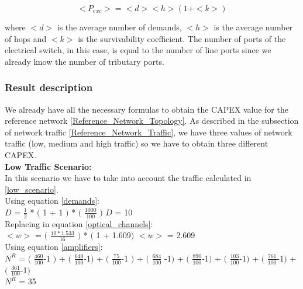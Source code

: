 \begin{equation}
<P_{exc}> = <d> <h> \left(1 + <k>\right)
\label{Pexc_opaque_protec}
\end{equation}

\vspace{11pt}
\noindent
where $<d>$ is the average number of demands, $<h>$ is the average number of hops and $<k>$	is the survivability coefficient. The number of ports of the electrical switch, in this case, is equal to the number of line ports since we already know the number of tributary ports.\\

\subsubsection{Result description}

We already have all the necessary formulas to obtain the CAPEX value for the reference network \ref{Reference_Network_Topology}. As described in the subsection of network traffic \ref{Reference_Network_Traffic}, we have three values of network traffic (low, medium and high traffic) so we have to obtain three different CAPEX.\\


\textbf{Low Traffic Scenario:}\\
In this scenario we have to take into account the traffic calculated in \ref{low_scenario}.\\

Using equation \ref{demands}:\\

$D$ = $\frac{1}{2}$ * $($ 1 + 1 $)$ * $($ $\frac{1000}{100}$ $)$ \qquad \qquad $D$ = 10\\

Replacing in equation \ref{optical_channels}:\\

$<w>$ = $($ $\frac{10 * 1.533}{16}$ $)$ * $($ 1 + 1.609$)$ \qquad \qquad $<w>$ = 2.609\\

Using equation \ref{amplifiers}:\\

$N^R$ = $($ $\frac{460}{100}$-1 $)$ + $($ $\frac{640}{100}$-1$)$ + $($ $\frac{75}{100}$-1 $)$ + $($ $\frac{684}{100}$ -1$)$ + $($ $\frac{890}{100}$-1$)$ + $($ $\frac{103}{100}$-1$)$ + $($ $\frac{761}{100}$-1$)$ + $($ $\frac{361}{100}$-1$)$\\

$N^R$ = 35\\

